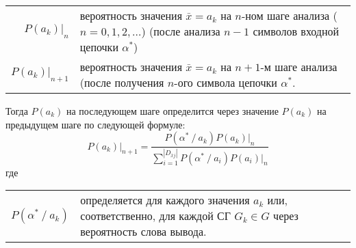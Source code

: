 \begin{tabular}[t]{@{} r @{\;---\;} p{} @{}}
  $P(a_k)\bigr|_n$ & вероятность значения $\bar{x} = a_k$ на $n$-ном
  шаге анализа ($n = 0,1,2,\ldots$) (после анализа $n-1$ символов
  входной цепочки $\alpha^*$)\\
  $P(a_k)\bigr|_{n+1}$ & вероятность значения $\bar{x} = a_k$ на $n +
  1$-м шаге анализа (после получения $n$-ого символа цепочки
  $\alpha^*$.
\end{tabular}

Тогда $P(a_k)$ на последующем шаге определится через значение $P(a_k)$
на предыдущем шаге по следующей формуле:
\begin{equation*}
  P(a_k)\bigr|_{n+1} = \frac{P(\alpha^* \mathop{/} a_k) P(a_k)\bigr|_n}
  {\sum\limits_{i=1}^{|D_{\bar{x}j}|} P(\alpha^* \mathop{/} a_i) P(a_i)\bigr|_n}
\end{equation*}
где \begin{tabular}[t]{@{} r @{\;---\;} p{} @{}}
  $P(\alpha^* \mathop{/} a_k)$ & определяется для каждого значения
  $a_k$ или, соответственно, для каждой СГ $G_k \in G$ через
  вероятность слова вывода.
\end{tabular}







